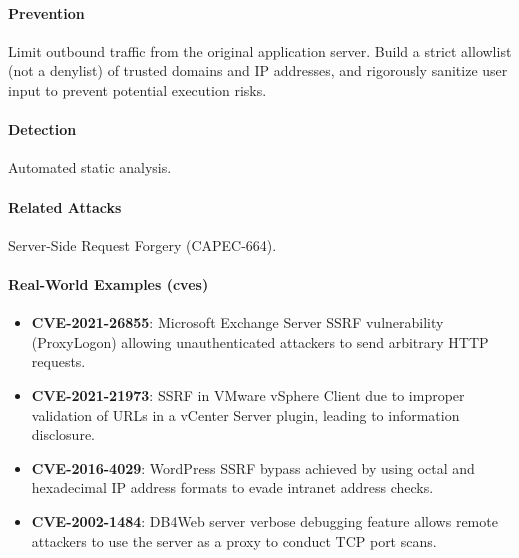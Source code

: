 \paragraph{Prevention} Limit outbound traffic from the original application server. Build a strict allowlist (not a denylist) of trusted domains and IP addresses, and rigorously sanitize user input to prevent potential execution risks.

\paragraph{Detection} Automated static analysis.

\paragraph{Related Attacks} Server-Side Request Forgery (CAPEC-664).

\paragraph{Real-World Examples (\glspl{cve})}
\begin{itemize}
    \item \textbf{CVE-2021-26855}: Microsoft Exchange Server SSRF vulnerability (ProxyLogon) allowing unauthenticated attackers to send arbitrary HTTP requests.
    \item \textbf{CVE-2021-21973}: SSRF in VMware vSphere Client due to improper validation of URLs in a vCenter Server plugin, leading to information disclosure.
    \item \textbf{CVE-2016-4029}: WordPress SSRF bypass achieved by using octal and hexadecimal IP address formats to evade intranet address checks.
    \item \textbf{CVE-2002-1484}: DB4Web server verbose debugging feature allows remote attackers to use the server as a proxy to conduct TCP port scans.
\end{itemize}

